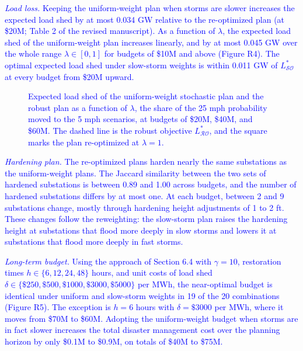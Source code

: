 \documentclass[authoryear,preprint,review,12pt]{elsarticle}\usepackage{amssymb}
\begin{document}
\textcolor{blue}{\textit{Load loss.} Keeping the uniform-weight plan when storms are slower increases the expected load shed by at most 0.034 GW relative to the re-optimized plan (at \$20M; Table 2 of the revised manuscript). As a function of $\lambda$, the expected load shed of the uniform-weight plan increases linearly, and by at most 0.045 GW over the whole range $\lambda \in [0,1]$ for budgets of \$10M and above (Figure R4). The optimal expected load shed under slow-storm weights is within 0.011 GW of $L^*_{\mathcal{SO}}$ at every budget from \$20M upward.}

\begin{figure}[htbp]
\centering
\caption{\textcolor{blue}{Expected load shed of the uniform-weight stochastic plan and the robust plan as a function of $\lambda$, the share of the 25 mph probability moved to the 5 mph scenarios, at budgets of \$20M, \$40M, and \$60M. The dashed line is the robust objective $L^*_{\mathcal{RO}}$, and the square marks the plan re-optimized at $\lambda = 1$.}}
\label{fig:r4}
\end{figure}

\textcolor{blue}{\textit{Hardening plan.} The re-optimized plans harden nearly the same substations as the uniform-weight plans. The Jaccard similarity between the two sets of hardened substations is between 0.89 and 1.00 across budgets, and the number of hardened substations differs by at most one. At each budget, between 2 and 9 substations change, mostly through hardening height adjustments of 1 to 2 ft. These changes follow the reweighting: the slow-storm plan raises the hardening height at substations that flood more deeply in slow storms and lowers it at substations that flood more deeply in fast storms.}

\textcolor{blue}{\textit{Long-term budget.} Using the approach of Section 6.4 with $\gamma = 10$, restoration times $h \in \{6, 12, 24, 48\}$ hours, and unit costs of load shed $\delta \in \{\$250, \$500, \$1000, \$3000, \$5000\}$ per MWh, the near-optimal budget is identical under uniform and slow-storm weights in 19 of the 20 combinations (Figure R5). The exception is $h = 6$ hours with $\delta = \$3000$ per MWh, where it moves from \$70M to \$60M. Adopting the uniform-weight budget when storms are in fact slower increases the total disaster management cost over the planning horizon by only \$0.1M to \$0.9M, on totals of \$40M to \$75M.}
\end{document}
